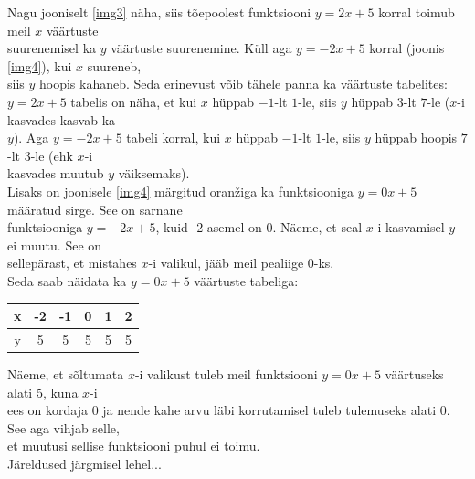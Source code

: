 \begin{center}
{{{\begin{flushleft}
\hspace{5mm} Nagu jooniselt \ref{img3} näha, siis tõepoolest funktsiooni $y=2x+5$ korral toimub meil $x$ väärtuste\\ \hspace{5mm} suurenemisel ka $y$ väärtuste suurenemine. Küll aga $y=-2x+5$ korral (joonis \ref{img4}), kui $x$ suureneb,\\ \hspace{5mm} siis $y$ hoopis kahaneb. Seda erinevust võib tähele panna ka väärtuste tabelites:\\ \hspace{5mm} $y=2x+5$ tabelis on näha, et kui $x$ hüppab $-1$-lt $1$-le, siis $y$ hüppab $3$-lt $7$-le ($x$-i kasvades kasvab ka \\ \hspace{5mm} $y$). Aga $y=-2x+5$ tabeli korral, kui $x$ hüppab $-1$-lt $1$-le, siis $y$ hüppab hoopis $7$-lt $3$-le (ehk $x$-i\\ \hspace{5mm} kasvades muutub $y$ väiksemaks).\\ \hspace{5mm} Lisaks on joonisele \ref{img4} märgitud oranžiga ka funktsiooniga $y=0x+5$ määratud sirge. See on sarnane\\ \hspace{5mm} funktsiooniga $y=-2x+5$, kuid -2 asemel on 0. Näeme, et seal $x$-i kasvamisel $y$ ei muutu. See on\\ \hspace{5mm} sellepärast, et mistahes $x$-i valikul, jääb meil pealiige 0-ks.\\
\hspace{5mm} Seda saab näidata ka $y=0x+5$ väärtuste tabeliga:\\
\vspace{2mm}
\hspace{5mm}
\begin{tabular}{c|c|c|c|c|c}
     x & -2 & -1 & 0 & 1 & 2 \\
     \hline
     y & 5 & 5 & 5 & 5 & 5
\end{tabular}

\vspace{2mm}
\hspace{5mm}
Näeme, et sõltumata $x$-i valikust tuleb meil funktsiooni $y=0x+5$ väärtuseks alati 5, kuna  $x$-i\\ \hspace{5mm} ees on kordaja $0$ ja nende kahe arvu läbi korrutamisel tuleb tulemuseks alati 0. See aga vihjab selle,\\ \hspace{5mm} et muutusi sellise funktsiooni puhul ei toimu.\\
\vspace{2mm}
\hspace{5mm} Järeldused järgmisel lehel...
\end{flushleft}}}}
\end{center}



